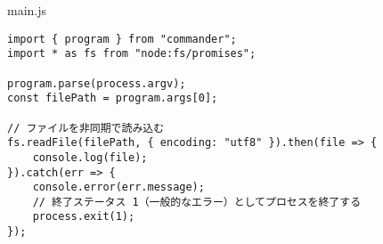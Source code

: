 \begin{listtitle}
main.js
\end{listtitle}
\begin{lstlisting}
import { program } from "commander";
import * as fs from "node:fs/promises";

program.parse(process.argv);
const filePath = program.args[0];

// ファイルを非同期で読み込む
fs.readFile(filePath, { encoding: "utf8" }).then(file => {
    console.log(file);
}).catch(err => {
    console.error(err.message);
    // 終了ステータス 1（一般的なエラー）としてプロセスを終了する
    process.exit(1);
});
\end{lstlisting}
\listend

